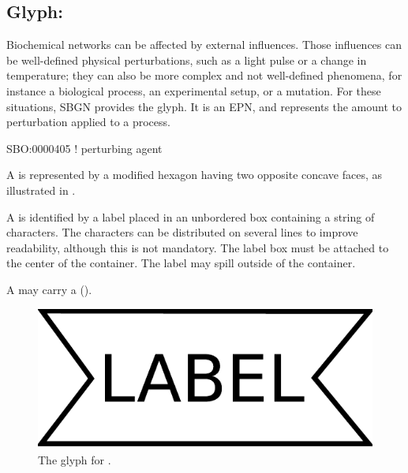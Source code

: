 
\subsection{Glyph: }
\label{sec:perturbation}
 
Biochemical networks can be affected by external influences.  Those
influences can be well-defined physical perturbations, such as a light
pulse or a change in temperature; they can also be more complex and not
well-defined phenomena, for instance a biological process, an experimental
setup, or a mutation.  For these situations, SBGN provides the
 glyph. It is an EPN, and represents the amount to perturbation applied to a process.  

\begin{glyphDescription}

\glyphSboTerm SBO:0000405 ! perturbing agent

\glyphContainer A  is represented by a modified hexagon
having two opposite concave faces, as illustrated in .

\glyphLabel A  is identified by a label placed in an
unbordered box containing a string of characters.  The characters can be
distributed on several lines to improve readability, although this is not
mandatory.  The label box must be attached to the center of the
 container.  The label may spill outside of the container.

\glyphAux A  may carry a 
().

\end{glyphDescription}

\begin{figure}[H]
  \centering
  \includegraphics[scale = 0.3]{images/perturbation}
  \caption{The \PD glyph for .}
  \label{fig:perturbation}
\end{figure}





